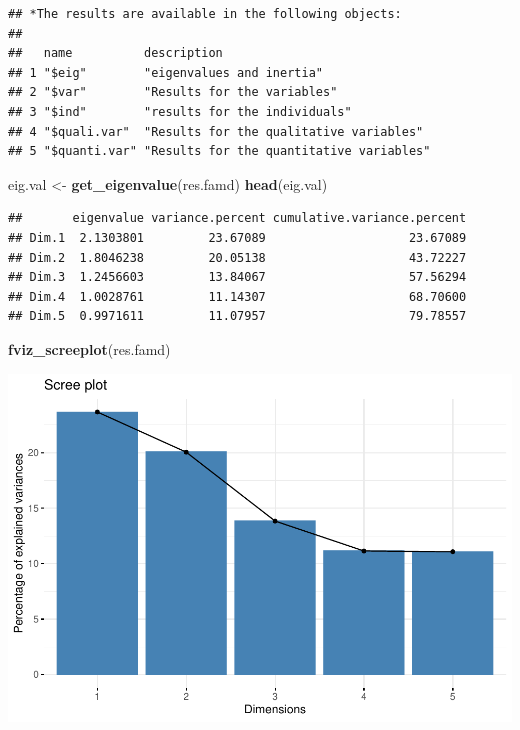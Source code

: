 \documentclass[
]{article}
\newenvironment{Shaded}{\begin{snugshade}}{\end{snugshade}}
\newcommand{\KeywordTok}[1]{\textcolor[rgb]{0.13,0.29,0.53}{\textbf{#1}}}
\newcommand{\NormalTok}[1]{#1}
\newcommand{\StringTok}[1]{\textcolor[rgb]{0.31,0.60,0.02}{#1}}
\begin{document}
\begin{verbatim}
## *The results are available in the following objects:
## 
##   name          description                             
## 1 "$eig"        "eigenvalues and inertia"               
## 2 "$var"        "Results for the variables"             
## 3 "$ind"        "results for the individuals"           
## 4 "$quali.var"  "Results for the qualitative variables" 
## 5 "$quanti.var" "Results for the quantitative variables"
\end{verbatim}

\begin{Shaded}
\begin{Highlighting}[]
\NormalTok{eig.val <-}\StringTok{ }\KeywordTok{get_eigenvalue}\NormalTok{(res.famd)}
\KeywordTok{head}\NormalTok{(eig.val)}
\end{Highlighting}
\end{Shaded}

\begin{verbatim}
##       eigenvalue variance.percent cumulative.variance.percent
## Dim.1  2.1303801         23.67089                    23.67089
## Dim.2  1.8046238         20.05138                    43.72227
## Dim.3  1.2456603         13.84067                    57.56294
## Dim.4  1.0028761         11.14307                    68.70600
## Dim.5  0.9971611         11.07957                    79.78557
\end{verbatim}

\begin{Shaded}
\begin{Highlighting}[]
\KeywordTok{fviz_screeplot}\NormalTok{(res.famd)}
\end{Highlighting}
\end{Shaded}

\includegraphics{project-code_files/figure-latex/unnamed-chunk-33-1.pdf}
\end{document}
